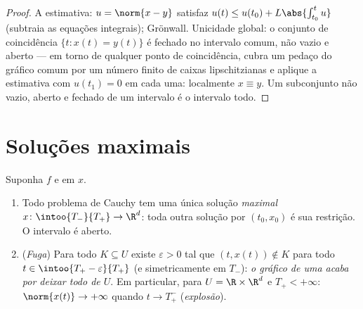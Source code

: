 \begin{proof}
A estimativa: $u = \norm{x - y}$ satisfaz $u(t) \leq u(t_0)
+ L\abs{\int_{t_0}^tu}$ (subtraia as equações integrais);
Grönwall. Unicidade global: o conjunto de coincidência $\{t : x(t)
= y(t)\}$ é fechado no
intervalo comum, não vazio e aberto --- em torno de qualquer ponto de
coincidência, cubra um pedaço  do gráfico comum por um número
finito de caixas lipschitzianas e aplique a estimativa com $u(t_1) = 0$ em cada
uma: localmente $x \equiv y$. Um subconjunto não vazio, aberto e fechado de um
intervalo é o intervalo todo.
\end{proof}

\section{Soluções maximais}

\begin{theorem}
\label{thm:b3:ode:maximal}
Suponha $f$  e  em $x$.
\begin{enumerate}
  \item Todo problema de Cauchy tem uma única solução \emph{maximal}
        $x \colon \intoo{T_-}{T_+} \to \R^d$: toda outra solução por $(t_0, x_0)$ é sua restrição. O intervalo é
        aberto.
  \item (\emph{Fuga}) Para todo  $K \subseteq U$ existe $\varepsilon > 0$ tal que $(t, x(t)) \notin
        K$
        para todo $t \in \intoo{T_+ - \varepsilon}{T_+}$ (e simetricamente em $T_-$): \emph{o gráfico de
        uma  acaba por deixar todo  de $U$}.
        Em particular, para $U = \R\times\R^d$ e $T_+ < +\infty$: $\norm{x(t)} \to +\infty$ quando $t \to T_+^-$
        (\emph{explosão}).
\end{enumerate}
\end{theorem}

